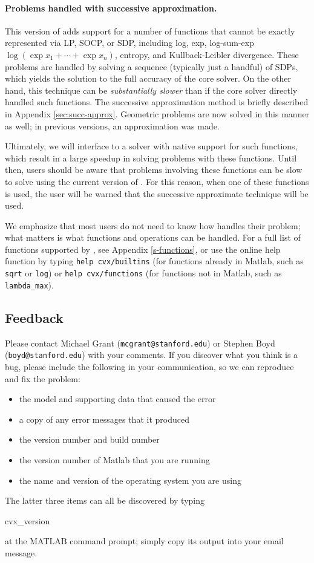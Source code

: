 \documentclass[12pt]{article}
\begin{document}
\paragraph{Problems handled with successive approximation.}
This version of \cvx adds support for a number of functions that cannot
be exactly represented via LP, SOCP, or SDP, including 
log, exp, log-sum-exp $\log (\exp x_1+ \cdots + \exp x_n)$,
entropy, and Kullback-Leibler divergence.
These problems are handled by solving a sequence (typically just a handful)
of SDPs, which yields the solution to the full accuracy of the core solver.
On the other hand, this technique can be 
\emph{substantially slower}
than if the core solver directly handled such functions.
The successive approximation method is briefly described in
Appendix \ref{sec:succ-approx}. Geometric problems are now solved in
this manner as well; in previous versions, an approximation was made.

Ultimately, we will interface \cvx to a solver with native support for 
such functions, which result in a large speedup in solving problems
with these functions.
Until then, users should be aware that problems involving these functions
can be slow to solve using the current version of \cvx.
For this reason, when one of these functions is used, the user will be 
warned that the successive approximate technique will be used.

We emphasize that most users do not need 
to know how \cvx handles their problem; what matters is what functions
and operations can be handled.
For a full list of functions supported by \cvx, 
see Appendix \ref{s-functions}, or use the online help function by typing
\verb+help cvx/builtins+ 
(for functions already in Matlab, such as \verb+sqrt+ or \verb+log+)
or \verb+help cvx/functions+
(for functions not in Matlab, such as \verb+lambda_max+).

\subsection{Feedback}
\label{sec:feedback}

Please contact Michael Grant (\texttt{mcgrant@stanford.edu}) 
or Stephen Boyd (\texttt{boyd@stanford.edu}) with 
your comments. If you discover what you think is a bug, 
please include the following in your communication,
so we can reproduce and fix the problem:
\begin{itemize}
\item the \cvx model and supporting data that caused the error
\item a copy of any error messages that it produced
\item the \cvx version number and build number
\item the version number of Matlab that you are running
\item the name and version of the operating system you are using
\end{itemize}
The latter three items can all be discovered by typing
\begin{code}
	cvx_version
\end{code}
at the MATLAB command prompt; simply copy its output
into your email message.
\end{document}
